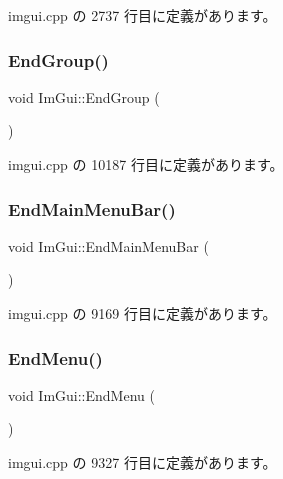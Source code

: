  imgui.\+cpp の 2737 行目に定義があります。

\mbox{\label{namespace_im_gui_a05fc97fc64f28a55486087f503d9a622}} 
\subsubsection{\texorpdfstring{End\+Group()}{EndGroup()}}
{\footnotesize\ttfamily void Im\+Gui\+::\+End\+Group (\begin{DoxyParamCaption}{ }\end{DoxyParamCaption})}



 imgui.\+cpp の 10187 行目に定義があります。

\mbox{\label{namespace_im_gui_ab92f330c808546b340eb7bdf7e5f7c95}} 
\subsubsection{\texorpdfstring{End\+Main\+Menu\+Bar()}{EndMainMenuBar()}}
{\footnotesize\ttfamily void Im\+Gui\+::\+End\+Main\+Menu\+Bar (\begin{DoxyParamCaption}{ }\end{DoxyParamCaption})}



 imgui.\+cpp の 9169 行目に定義があります。

\mbox{\label{namespace_im_gui_a1448a5a4e8c431c15f991e9255c0df95}} 
\subsubsection{\texorpdfstring{End\+Menu()}{EndMenu()}}
{\footnotesize\ttfamily void Im\+Gui\+::\+End\+Menu (\begin{DoxyParamCaption}{ }\end{DoxyParamCaption})}



 imgui.\+cpp の 9327 行目に定義があります。

\mbox{\label{namespace_im_gui_aa226265c140eb6ee375c5b9abc69c4fc}} 
